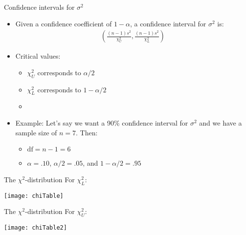 \documentclass[xcolor=dvipsnames]{beamer}
\begin{document}
\begin{frame}{Confidence intervals for $\sigma^2$}
	\begin{itemize}
		\item Given a confidence coefficient of $1-\alpha$, a confidence interval for $\sigma^2$ is: \pause
		\begin{gather*}
		\left(\frac{(n-1) s^2}{\chi_U^2}, \frac{(n-1)s^2}{\chi_L^2} \right)
		\end{gather*}\pause
		\item Critical values: \pause
		\begin{itemize}
			\item $\chi^2_U$ corresponds to $\alpha / 2$ \pause
			\item $\chi^2_L$ corresponds to $1 - \alpha / 2$ \pause
			\item[]
		\end{itemize}
	\item Example: Let's say we want a 90\% confidence interval for $\sigma^2$ and we have a sample size of $n = 7$. Then: \pause
	\begin{itemize}
		\item  $\text{df} = n-1 = 6$ \pause
		\item $\alpha = .10$, $\alpha / 2 = .05$, and $1-\alpha / 2 = .95$
	\end{itemize}
	\end{itemize}
\end{frame}

\begin{frame}{The  $\chi^2$-distribution}
	For $\chi^2_L$:
	\begin{center}
		\texttt{[image: chiTable]}
	\end{center}
\end{frame}

\begin{frame}{The  $\chi^2$-distribution}
	For $\chi^2_U$:
	\begin{center}
		\texttt{[image: chiTable2]}
	\end{center}
\end{frame}
\end{document}

